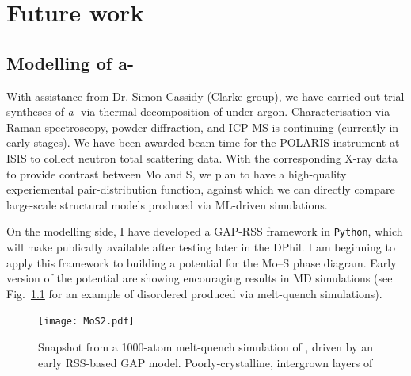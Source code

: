 \documentclass[12pt,a4paper,twoside,nobind]{ociamthesis}
\begin{document}


%
%
\chapter{Future work}


\section{Modelling of a-}

With assistance from Dr. Simon Cassidy (Clarke group), we have carried out trial syntheses of \textit{a}- via thermal decomposition of  under argon. Characterisation via Raman spectroscopy, powder diffraction, and ICP-MS
is continuing (currently in early stages). We have been awarded beam time for the POLARIS instrument at ISIS to collect neutron total scattering data. With the corresponding X-ray data to provide contrast between Mo and S, we plan to have
a high-quality experiemental pair-distribution function, against which we can directly compare large-scale structural models produced via ML-driven simulations.


On the modelling side, I have developed a GAP-RSS framework in \texttt{Python}, which will make publically available after testing later in the DPhil. I am beginning to apply this framework to building a potential for the Mo--S phase diagram.
Early version of the potential are showing encouraging results in MD simulations (see Fig.\ \ref{fig:MoS2} for an example of disordered  produced via melt-quench simulations). 

\begin{figure}[ht]
  \centering
  \texttt{[image: MoS2.pdf]}
  \caption{
    Snapshot from a 1000-atom melt-quench simulation of , driven by an early RSS-based GAP model. Poorly-crystalline, intergrown layers of 
    }
  \label{fig:MoS2}
\end{figure}
\end{document}

